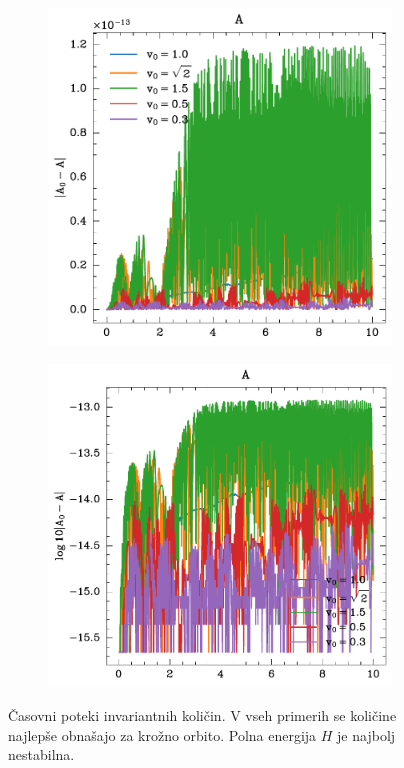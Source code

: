 \begin{figure}
    \begin{subfigure}{0.49\textwidth}
        \includegraphics[width=\textwidth]{../images/1-1-A_lin.pdf}
    \end{subfigure}
    \hfill
    \begin{subfigure}{0.49\textwidth}
        \includegraphics[width=\textwidth]{../images/1-1-A_log.pdf}
    \end{subfigure}
    \caption{Časovni poteki invariantnih količin. V vseh primerih se količine najlepše obnašajo za krožno orbito. Polna energija $H$ je najbolj nestabilna.}
    
\end{figure}

